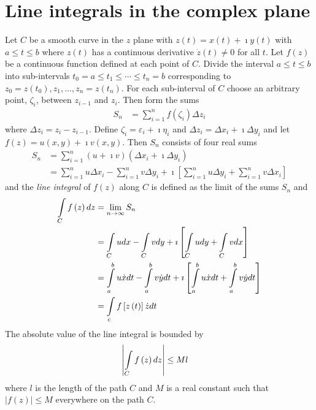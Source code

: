 \documentclass[a4paper,twoside,10pt,english]{report}
\begin{document}
\section{Line integrals in the complex plane}
Let $C$ be a smooth curve in the $z$ plane with $z(t)=x(t)+\imath y(t)$
with $a\leq t\leq b$ where $z(t)$ has a continuous derivative $\dot{z}(t)\neq0$
for all $t$. Let $f\left(z\right)$ be a continuous function defined at each
point of $C$. Divide the interval $a\leq t\leq b$ into sub-intervals
$t_{0}=a\leq t_{1}\leq\cdots\leq t_{n}=b$ corresponding to 
$z_{0}=z(t_{0}),z_{1},\ldots,z_{n}=z(t_{n})$.
For each sub-interval of $C$ choose an arbitrary point, $\zeta_{i}$,
between $z_{i-1}$ and $z_{i}$. Then form the sums
\begin{align*}
S_{n} & = \sum_{i=1}^{n}f(\zeta_{i})\Delta z_{i}
\end{align*}
where $\Delta z_{i}=z_{i}-z_{i-1}$. Define $\zeta_{i}=\varepsilon_{i}+\imath\eta_{i}$
and $\Delta z_{i}=\Delta x_{i}+\imath\Delta y_{i}$ and let 
$f\left(z\right)=u(x,y)+\imath v(x,y)$. Then $S_{n}$ consists of four real sums
\begin{align*}
S_{n} & = \sum_{i=1}^{n}\left(u+\imath v\right)\left(\Delta x_{i}+\imath\Delta y_{i}\right)\\
 & = \sum_{i=1}^{n}u\Delta x_{i}-\sum_{i=1}^{n}v\Delta y_{i}+\imath\left[\sum_{i=1}^{n}u\Delta y_{i}+\sum_{i=1}^{n}v\Delta x_{i}\right]
\end{align*}
and the \emph{line integral} of $f\left(z\right)$ along $C$ is defined as the
limit of the sums $S_{n}$ and
\begin{align*}
\intop_{C}f\left(z\right)dz & = \lim_{n\rightarrow\infty}S_{n}\\
 & = \intop_{C}udx-\intop_{C}vdy+\imath\left[\intop_{C}udy+\intop_{C}vdx\right]\\
 & = \intop_{a}^{b}u\dot{x}dt-\intop_{a}^{b}v\dot{y}dt+\imath\left[\intop_{a}^{b}u\dot{x}dt+\intop_{a}^{b}v\dot{y}dt\right]\\
 & = \intop_{c}f\left[z\left(t\right)\right]\dot{z}dt
\end{align*}
The absolute value of the line integral is bounded by
\begin{align*}
\left|\intop_{C}f\left(z\right)dz\right| & \leq Ml
\end{align*}
where $l$ is the length of the path $C$ and $M$ is a real constant
such that $\left|f\left(z\right)\right|\leq M$ everywhere on the path $C$.
\end{document}
